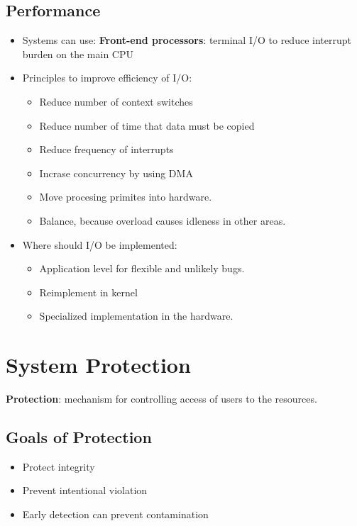 \documentclass[10pt]{report}
\begin{document}
	\section{Performance}
		\begin{itemize}
			\item Systems can use: \textbf{Front-end processors}: terminal I/O to reduce interrupt burden on the main CPU
			\item Principles to improve efficiency of I/O:
			\begin{itemize}
				\item Reduce number of context switches
				\item Reduce number of time that data must be copied
				\item Reduce frequency of interrupts
				\item Incrase concurrency by using DMA
				\item Move procesing primites into hardware.
				\item Balance, because overload causes idleness in other areas.
			\end{itemize}
			\item Where should I/O be implemented:
			\begin{itemize}
				\item Application level for flexible and unlikely bugs.
				\item Reimplement in kernel
				\item Specialized implementation in the hardware.
			\end{itemize}
		\end{itemize}


\chapter{System Protection} \label{ch:Chapter14}
	\textbf{Protection}: mechanism for controlling access of users to the resources.
	\section{Goals of Protection}
		\begin{itemize}
			\item Protect integrity
			\item Prevent intentional violation
			\item Early detection can prevent contamination
		\end{itemize}
\end{document}
